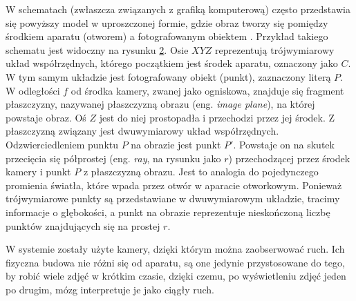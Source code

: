 \begin{figure}[h!]
\begin{center}

\end{center}
\label{camera_obscura}
\end{figure} 

W schematach (zwłaszcza związanych z grafiką komputerową) często przedstawia się powyższy model w uproszczonej formie, gdzie obraz tworzy się pomiędzy środkiem aparatu (otworem) a fotografowanym obiektem \cite{Pinhole_MSc}. Przykład takiego schematu jest widoczny na rysunku \ref{pinhole_model}. Osie $XYZ$ reprezentują trójwymiarowy układ współrzędnych, którego początkiem jest środek aparatu, oznaczony jako $C$. W tym samym układzie jest fotografowany obiekt (punkt), zaznaczony literą $P$. W odległości $f$ od środka kamery, zwanej jako ogniskowa, znajduje się fragment płaszczyzny, nazywanej płaszczyzną obrazu (eng. \textit{image plane}), na której powstaje obraz. Oś $Z$ jest do niej prostopadła i przechodzi przez jej środek. Z płaszczyzną związany jest dwuwymiarowy układ współrzędnych. Odzwierciedleniem punktu $P$ na obrazie jest punkt $P'$. Powstaje on na skutek przecięcia się półprostej (eng. \textit{ray}, na rysunku jako $r$) przechodzącej przez środek kamery i punkt $P$ z płaszczyzną obrazu. Jest to analogia do pojedynczego promienia światła, które wpada przez otwór w aparacie otworkowym. Ponieważ trójwymiarowe punkty są przedstawiane w dwuwymiarowym układzie, tracimy informacje o głębokości, a punkt na obrazie reprezentuje nieskończoną liczbę punktów znajdujących się na prostej $r$.

\begin{figure}[h!]
\begin{center}

\end{center}
\label{pinhole_model}
\end{figure} 

W systemie zostały użyte kamery, dzięki którym można zaobserwować ruch. Ich fizyczna budowa nie różni się od aparatu, są one jedynie przystosowane do tego, by robić wiele zdjęć w krótkim czasie, dzięki czemu, po wyświetleniu zdjęć jeden po drugim, mózg interpretuje je jako ciągły ruch.

